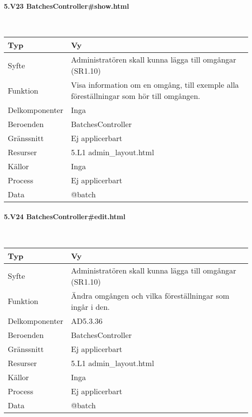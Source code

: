 \documentclass[a4paper, twoside, 11pt, titlepage]{article}
\begin{document}
			\paragraph{5.V23 BatchesController\#show.html}\

			\begin {table} [ht] \begin{tabular} {  p{3.5cm} p{9.6cm} }
				\hline
				{Typ} & {Vy} \\
				\hline
				{Syfte} & {Administratören skall kunna lägga till omgångar (SR1.10)} \\
				\hline
				{Funktion} & {Visa information om en omgång, till exemple alla föreställningar som hör till omgången.} \\
				\hline
				{Delkomponenter} & {Inga} \\
				\hline
				{Beroenden} & {BatchesController} \\
				\hline
				{Gränssnitt} & {Ej applicerbart} \\
				\hline
				{Resurser} & {5.L1 admin\_layout.html} \\
				\hline
				{Källor} & {Inga} \\
				\hline
				{Process} & {Ej applicerbart} \\
				\hline
				{Data} & {@batch} \\
				\hline
			\end{tabular} \end{table} \FloatBarrier


			\paragraph{5.V24 BatchesController\#edit.html}\

			\begin {table} [ht] \begin{tabular} {  p{3.5cm} p{9.6cm} }
				\hline
				{Typ} & {Vy} \\
				\hline
				{Syfte} & {Administratören skall kunna lägga till omgångar (SR1.10)} \\
				\hline
				{Funktion} & {Ändra omgången och vilka föreställningar som ingår i den.} \\
				\hline
				{Delkomponenter} & {AD5.3.36} \\
				\hline
				{Beroenden} & {BatchesController} \\
				\hline
				{Gränssnitt} & {Ej applicerbart} \\
				\hline
				{Resurser} & {5.L1 admin\_layout.html} \\
				\hline
				{Källor} & {Inga} \\
				\hline
				{Process} & {Ej applicerbart} \\
				\hline
				{Data} & {@batch} \\
				\hline
			\end{tabular} \end{table} \FloatBarrier
\end{document}
